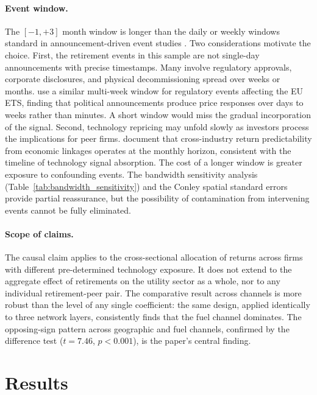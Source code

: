 \documentclass[12pt,a4paper]{article}
\begin{document}
\paragraph{Event window.}
The $[-1, +3]$ month window is longer than the daily or weekly windows standard in announcement-driven event studies \citep{CampbellLoMacKinlay1997}. Two considerations motivate the choice. First, the retirement events in this sample are not single-day announcements with precise timestamps. Many involve regulatory approvals, corporate disclosures, and physical decommissioning spread over weeks or months. \citet{KochGrosjeanFussEdenhofer2016} use a similar multi-week window for regulatory events affecting the EU ETS, finding that political announcements produce price responses over days to weeks rather than minutes. A short window would miss the gradual incorporation of the signal. Second, technology repricing may unfold slowly as investors process the implications for peer firms. \citet{MenzlyOzbas2010} document that cross-industry return predictability from economic linkages operates at the monthly horizon, consistent with the timeline of technology signal absorption. The cost of a longer window is greater exposure to confounding events. The bandwidth sensitivity analysis (Table~\ref{tab:bandwidth_sensitivity}) and the Conley spatial standard errors provide partial reassurance, but the possibility of contamination from intervening events cannot be fully eliminated.

\paragraph{Scope of claims.}
The causal claim applies to the cross-sectional allocation of returns across firms with different pre-determined technology exposure. It does not extend to the aggregate effect of retirements on the utility sector as a whole, nor to any individual retirement-peer pair. The comparative result across channels is more robust than the level of any single coefficient: the same design, applied identically to three network layers, consistently finds that the fuel channel dominates. The opposing-sign pattern across geographic and fuel channels, confirmed by the difference test ($t = 7.46$, $p < 0.001$), is the paper's central finding.


\section{Results}\label{sec:results}
\end{document}
